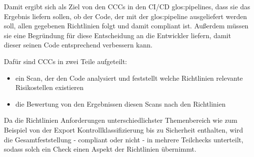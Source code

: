 \documentclass[../main.tex]{subfiles}
\begin{document}
Damit ergibt sich als Ziel von den \glspl{CCC} in den \gls{CI/CD} \glspl{glos:pipeline}, dass sie das Ergebnis liefern sollen, ob der Code, der mit der \gls{glos:pipeline} ausgeliefert werden soll, allen gegebenen Richtlinien folgt und damit compliant ist.
Außerdem müssen sie eine Begründung für diese Entscheidung an die Entwickler liefern, damit dieser seinen Code entsprechend verbessern kann.

Dafür sind \glspl{CCC} in zwei Teile aufgeteilt:
\begin{itemize}
    \item ein Scan, der den Code analysiert und feststellt welche Richtlinien relevante Risikostellen existieren 
    \item die Bewertung von den Ergebnissen diesen Scans nach den Richtlinien
  \end{itemize}

Da die Richtlinien Anforderungen unterschiedlichster Themenbereich wie zum Beispiel von der Export Kontrollklassifizierung bis zu Sicherheit enthalten, wird die Gesamtfeststellung - compliant oder nicht - in mehrere Teilchecks unterteilt, sodass solch ein Check einen Aspekt der Richtlinien übernimmt. 
\end{document}
